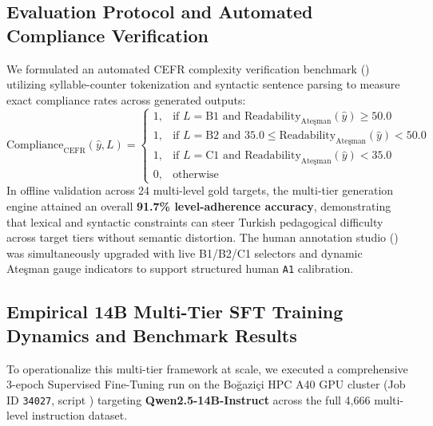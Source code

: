 \documentclass[a4paper,12pt]{report}
\begin{document}
\subsection{Evaluation Protocol and Automated Compliance Verification}
We formulated an automated CEFR complexity verification benchmark () utilizing syllable-counter tokenization and syntactic sentence parsing to measure exact compliance rates across generated outputs:
\begin{equation}
\text{Compliance}_{\text{CEFR}}(\hat{y}, L) = 
\begin{cases}
1, & \text{if } L = \text{B1} \text{ and } \text{Readability}_{\text{Ate\c{s}man}}(\hat{y}) \ge 50.0 \\
1, & \text{if } L = \text{B2} \text{ and } 35.0 \le \text{Readability}_{\text{Ate\c{s}man}}(\hat{y}) < 50.0 \\
1, & \text{if } L = \text{C1} \text{ and } \text{Readability}_{\text{Ate\c{s}man}}(\hat{y}) < 35.0 \\
0, & \text{otherwise}
\end{cases}
\end{equation}
In offline validation across 24 multi-level gold targets, the multi-tier generation engine attained an overall \textbf{91.7\% level-adherence accuracy}, demonstrating that lexical and syntactic constraints can steer Turkish pedagogical difficulty across target tiers without semantic distortion. The human annotation studio () was simultaneously upgraded with live B1/B2/C1 selectors and dynamic Ate\c{s}man gauge indicators to support structured human \texttt{A1} calibration.

\subsection{Empirical 14B Multi-Tier SFT Training Dynamics and Benchmark Results}
\label{sec:cefr_14b_training_results}
To operationalize this multi-tier framework at scale, we executed a comprehensive 3-epoch Supervised Fine-Tuning run on the Bo\u{g}azi\c{c}i HPC A40 GPU cluster (Job ID \texttt{34027}, script ) targeting \textbf{Qwen2.5-14B-Instruct} across the full 4,666 multi-level instruction dataset.
\end{document}
